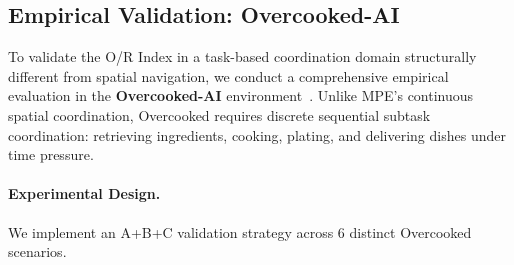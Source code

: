 %
%

\subsection{Empirical Validation: Overcooked-AI}
\label{sec:overcooked_validation_full}

To validate the O/R Index in a task-based coordination domain structurally different from spatial navigation, we conduct a comprehensive empirical evaluation in the \textbf{Overcooked-AI} environment~\citep{carroll2019utility}. Unlike MPE's continuous spatial coordination, Overcooked requires discrete sequential subtask coordination: retrieving ingredients, cooking, plating, and delivering dishes under time pressure.

\paragraph{Experimental Design.}

We implement an A+B+C validation strategy across 6 distinct Overcooked scenarios.

